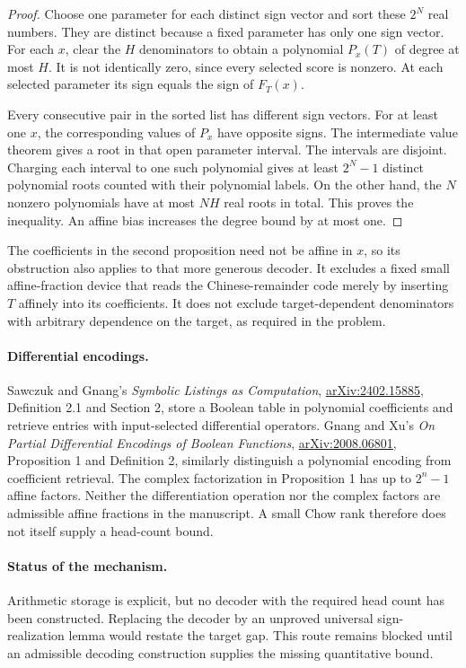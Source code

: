 \documentclass[11pt]{article}
\begin{document}
\begin{proof}
Choose one parameter for each distinct sign vector and sort these
$2^N$ real numbers. They are distinct because a fixed parameter has
only one sign vector. For each $x$, clear the $H$ denominators to obtain
a polynomial $P_x(T)$ of degree at most $H$. It is not identically
zero, since every selected score is nonzero. At each selected
parameter its sign equals the sign of $F_T(x)$.

Every consecutive pair in the sorted list has different sign vectors.
For at least one $x$, the corresponding values of $P_x$ have opposite
signs. The intermediate value theorem gives a root in that open
parameter interval. The intervals are disjoint. Charging each
interval to one such polynomial gives at least $2^N-1$ distinct
polynomial roots counted with their polynomial labels. On the other
hand, the $N$ nonzero polynomials have at most $NH$ real roots in
total. This proves the inequality. An affine bias increases the
degree bound by at most one.
\end{proof}

The coefficients in the second proposition need not be affine in
$x$, so its obstruction also applies to that more generous decoder.
It excludes a fixed small affine-fraction device that reads the
Chinese-remainder code merely by inserting $T$ affinely into its
coefficients. It does not exclude target-dependent denominators with
arbitrary dependence on the target, as required in the problem.

\paragraph{Differential encodings.}
Sawczuk and Gnang's \emph{Symbolic Listings as Computation},
\href{https://arxiv.org/pdf/2402.15885}{arXiv:2402.15885},
Definition 2.1 and Section 2, store a Boolean table in polynomial
coefficients and retrieve entries with input-selected differential
operators. Gnang and Xu's
\emph{On Partial Differential Encodings of Boolean Functions},
\href{https://arxiv.org/pdf/2008.06801}{arXiv:2008.06801},
Proposition 1 and Definition 2, similarly distinguish a polynomial
encoding from coefficient retrieval. The complex factorization in
Proposition 1 has up to $2^n-1$ affine factors. Neither the
differentiation operation nor the complex factors are admissible
affine fractions in the manuscript. A small Chow rank therefore
does not itself supply a head-count bound.

\paragraph{Status of the mechanism.}
Arithmetic storage is explicit, but no decoder with the required
head count has been constructed. Replacing the decoder by an
unproved universal sign-realization lemma would restate the target
gap. This route remains blocked until an admissible decoding
construction supplies the missing quantitative bound.
\end{document}
